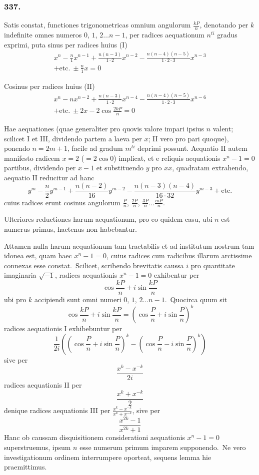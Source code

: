 \documentclass[12pt,a4paper]{article}
\theoremstyle{plain}
\theoremstyle{definition}
\theoremstyle{remark}
\begin{document}
\subsubsection*{337.}

Satis constat, functiones trigonometricas omnium angulorum
$\frac{kP}{n}$, denotando per $k$ indefinite omnes numeros $0$, $1$, $2\dots n-1$,
per radices aequationum $n^{ti}$ gradus exprimi, puta sinus per radices huius (I)
\begin{multline*}
x^n - \frac{n}{1}x^{n-1} + \frac{n(n-3)}{1\cdot 2}x^{n-2} - \frac{n(n-4)(n-5)}{1\cdot 2\cdot 3}x^{n-3} \\
+ \text{etc.}\ \pm \frac{n}{1}x = 0
\end{multline*}

Cosinus per radices huius (II)
\begin{multline*}
x^n - nx^{n-2} + \frac{n(n-3)}{1\cdot 2}x^{n-4} - \frac{n(n-4)(n-5)}{1\cdot 2\cdot 3}x^{n-6} \\
+ \text{etc.}\ \pm 2x - 2\cos\frac{2kP}{n} = 0
\end{multline*}

Hae aequationes (quae generaliter pro quovis valore impari ipsius $n$
valent; scilicet I et III, dividendo partem a laeva per $x$; II vero pro pari
quoque), ponendo $n=2m+1$, facile ad gradum $m^{ti}$ deprimi possunt.
Aequatio II autem manifesto radicem $x=2$ ($=2\cos 0$) implicat, et e
reliquis aequationis $x^n-1=0$ partibus, dividendo per $x-1$ et
substituendo $y$ pro $xx$, quadratam extrahendo, aequatio II reducitur ad
hanc
\[y^m - \frac{n}{2}y^{m-1} + \frac{n(n-2)}{16}y^{m-2} - \frac{n(n-3)(n-4)}{16\cdot 32}y^{m-3} + \text{etc.}\]
cuius radices erunt cosinus angulorum $\frac{P}{n}$, $\frac{2P}{n}$, $\frac{3P}{n}\dots\frac{mP}{n}$.

Ulteriores reductiones harum aequationum, pro eo quidem casu, ubi $n$
est numerus primus, hactenus non habebantur.

Attamen nulla harum aequationum tam tractabilis et ad institutum
nostrum tam idonea est, quam haec $x^n-1=0$, cuius radices cum radicibus
illarum arctissime connexas esse constat.\ Scilicet, scribendo brevitatis
caussa $i$ pro quantitate imaginaria $\sqrt{-1}$, radices aequationis $x^n-1=0$
exhibentur per
\[\cos\frac{kP}{n} + i\sin\frac{kP}{n}\]
ubi pro $k$ accipiendi sunt omni numeri $0$, $1$, $2\dots n-1$.\ Quocirca
quum sit
\[\cos\frac{kP}{n} + i\sin\frac{kP}{n} = \left(\cos\frac{P}{n} + i\sin\frac{P}{n}\right)^k\]
radices aequationis I exhibebuntur per
\[\frac{1}{2i}\left(\left(\cos\frac{P}{n} + i\sin\frac{P}{n}\right)^k - \left(\cos\frac{P}{n} - i\sin\frac{P}{n}\right)^k\right)\]
sive per
\[\frac{x^k - x^{-k}}{2i}\]
radices aequationis II per
\[\frac{x^k + x^{-k}}{2}\]
denique radices aequationis III per $\frac{x^k - x^{-k}}{x^k + x^{-k}}$, sive per
\[\frac{x^{2k} - 1}{x^{2k} + 1}\]
Hanc ob caussam disquisitionem considerationi aequationis $x^n-1=0$
superstruemus, ipsum $n$ esse numerum primum imparem supponendo.\ Ne
vero investigationum ordinem interrumpere oporteat, sequens lemma hie
praemittimus.
\end{document}
